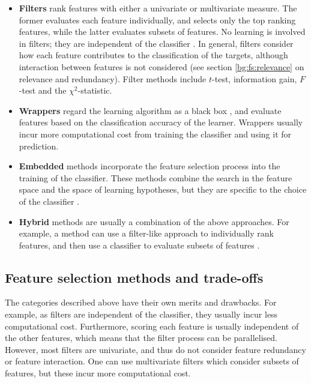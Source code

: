 \documentclass[12pt, twoside, a4paper]{report}
\begin{document}
\begin{itemize}
\item \textbf{Filters} rank features with either a univariate or multivariate measure. The former evaluates each feature individually, and selects only the top ranking features, while the latter evaluates subsets of features. No learning is involved in filters; they are independent of the classifier \cite{RefWorks:216}. In general, filters consider how each feature contributes to the classification of the targets, although interaction between features is not considered \cite{RefWorks:232} (see section \ref{bg:fs:relevance} on relevance and redundancy). Filter methods include $t$-test, information gain, $F$-test and the $\chi^2$-statistic.

\item \textbf{Wrappers} regard the learning algorithm as a black box \cite{RefWorks:140}, and evaluate features based on the classification accuracy of the learner. Wrappers usually incur more computational cost from training the classifier and using it for prediction.

\item \textbf{Embedded} methods incorporate the feature selection process into the training of the classifier. These methods combine the search in the feature space and the space of learning hypotheses, but they are specific to the choice of the classifier \cite{RefWorks:118}.

\item \textbf{Hybrid} methods are usually a combination of the above approaches. For example, a method can use a filter-like approach to individually rank features, and then use a classifier to evaluate subsets of features \cite{RefWorks:140}.

\end{itemize}

\subsection{Feature selection methods and trade-offs} \label{bg:fs:tradeoff}

The categories described above have their own merits and drawbacks. For example, as filters are independent of the classifier, they usually incur less computational cost. Furthermore, scoring each feature is usually independent of the other features, which means that the filter process can be parallelised. However, most filters are univariate, and thus do not consider feature redundancy or feature interaction. One can use multivariate filters which consider subsets of features, but these incur more computational cost.
\end{document}
